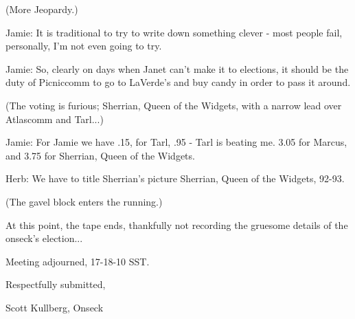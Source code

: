 \documentclass[12pt]{article}
\begin{document}
(More Jeopardy.)

Jamie: It is traditional to try to write down something clever - most people fail, personally, I'm not even going to try.

Jamie: So, clearly on days when Janet can't make it to elections, it should be the duty of Picniccomm to go to LaVerde's and buy candy in order to pass it around.

(The voting is furious; Sherrian, Queen of the Widgets, with a narrow lead over Atlascomm and Tarl...)

Jamie: For Jamie we have .15, for Tarl, .95 - Tarl is beating me. 3.05 for Marcus, and 3.75 for Sherrian, Queen of the Widgets.

Herb: We have to title Sherrian's picture Sherrian, Queen of the Widgets, 92-93.

(The gavel block enters the running.)

At this point, the tape ends, thankfully not recording the gruesome details of the onseck's election...

\vspace{12pt}

\noindent
Meeting adjourned, 17-18-10 SST.

\vspace{18pt}

\centerline{Respectfully submitted,}
\centerline{Scott Kullberg, Onseck}
\end{document}
